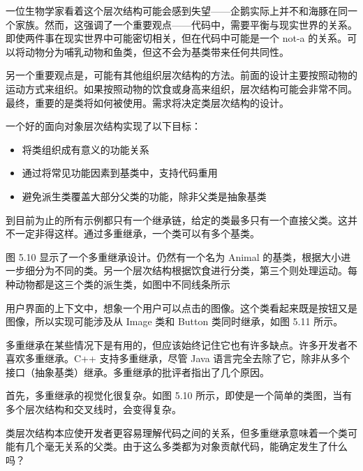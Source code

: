 
一位生物学家看着这个层次结构可能会感到失望——企鹅实际上并不和海豚在同一个家族。然而，这强调了一个重要观点——代码中，需要平衡与现实世界的关系。即使两件事在现实世界中可能密切相关，但在代码中可能是一个 not-a 的关系。可以将动物分为哺乳动物和鱼类，但这不会为基类带来任何共同性。

另一个重要观点是，可能有其他组织层次结构的方法。前面的设计主要按照动物的运动方式来组织。如果按照动物的饮食或身高来组织，层次结构可能会非常不同。最终，重要的是类将如何被使用。需求将决定类层次结构的设计。

一个好的面向对象层次结构实现了以下目标：

\begin{itemize}
\item
将类组织成有意义的功能关系

\item
通过将常见功能因素到基类中，支持代码重用

\item
避免派生类覆盖大部分父类的功能，除非父类是抽象基类
\end{itemize}


到目前为止的所有示例都只有一个继承链，给定的类最多只有一个直接父类。这并不一定非得这样。通过多重继承，一个类可以有多个基类。

图 5.10 显示了一个多重继承设计。仍然有一个名为 Animal 的基类，根据大小进一步细分为不同的类。另一个层次结构根据饮食进行分类，第三个则处理运动。每种动物都是这三个类的派生类，如图中不同线条所示


用户界面的上下文中，想象一个用户可以点击的图像。这个类看起来既是按钮又是图像，所以实现可能涉及从 Image 类和 Button 类同时继承，如图 5.11 所示。


多重继承在某些情况下是有用的，但应该始终记住它也有许多缺点。许多开发者不喜欢多重继承。C++ 支持多重继承，尽管 Java 语言完全去除了它，除非从多个接口（抽象基类）继承。多重继承的批评者指出了几个原因。

首先，多重继承的视觉化很复杂。如图 5.10 所示，即使是一个简单的类图，当有多个层次结构和交叉线时，会变得复杂。

类层次结构本应使开发者更容易理解代码之间的关系，但多重继承意味着一个类可能有几个毫无关系的父类。由于这么多类都为对象贡献代码，能确定发生了什么吗？

